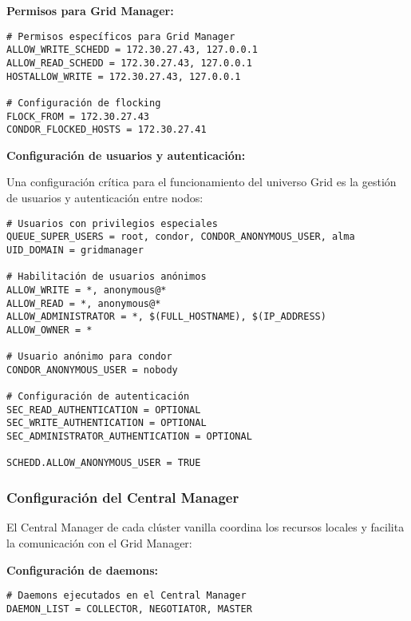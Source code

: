 \textbf{Permisos para Grid Manager:}

\begin{verbatim}
# Permisos específicos para Grid Manager
ALLOW_WRITE_SCHEDD = 172.30.27.43, 127.0.0.1
ALLOW_READ_SCHEDD = 172.30.27.43, 127.0.0.1
HOSTALLOW_WRITE = 172.30.27.43, 127.0.0.1

# Configuración de flocking
FLOCK_FROM = 172.30.27.43
CONDOR_FLOCKED_HOSTS = 172.30.27.41
\end{verbatim}

\textbf{Configuración de usuarios y autenticación:}

Una configuración crítica para el funcionamiento del universo Grid es la gestión de usuarios y autenticación entre nodos:

\begin{verbatim}
# Usuarios con privilegios especiales
QUEUE_SUPER_USERS = root, condor, CONDOR_ANONYMOUS_USER, alma
UID_DOMAIN = gridmanager

# Habilitación de usuarios anónimos
ALLOW_WRITE = *, anonymous@*
ALLOW_READ = *, anonymous@*
ALLOW_ADMINISTRATOR = *, $(FULL_HOSTNAME), $(IP_ADDRESS)
ALLOW_OWNER = *

# Usuario anónimo para condor
CONDOR_ANONYMOUS_USER = nobody

# Configuración de autenticación
SEC_READ_AUTHENTICATION = OPTIONAL
SEC_WRITE_AUTHENTICATION = OPTIONAL
SEC_ADMINISTRATOR_AUTHENTICATION = OPTIONAL

SCHEDD.ALLOW_ANONYMOUS_USER = TRUE
\end{verbatim}

\FloatBarrier\subsubsection{Configuración del Central Manager}

El Central Manager de cada clúster vanilla coordina los recursos locales y facilita la comunicación con el Grid Manager:

\textbf{Configuración de daemons:}

\begin{verbatim}
# Daemons ejecutados en el Central Manager
DAEMON_LIST = COLLECTOR, NEGOTIATOR, MASTER
\end{verbatim}

